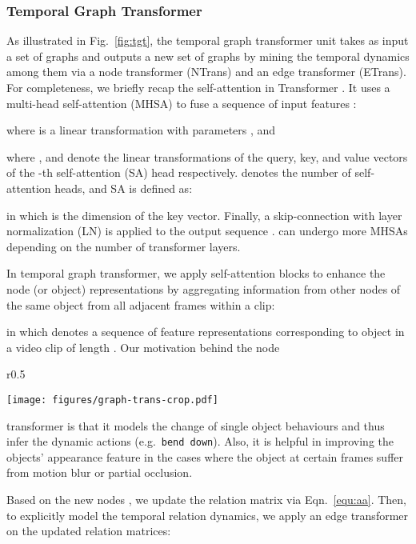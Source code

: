 \documentclass[runningheads]{llncs}
\newcommand{\eg}{e.g.}
\begin{document}
\subsubsection{Temporal Graph Transformer}
As illustrated in Fig.~\ref{fig:tgt}, the temporal graph transformer unit takes as input a set of graphs  and outputs a new 
set of graphs  by mining the temporal dynamics among them via a node transformer (NTrans) and an edge transformer (ETrans). 
For completeness, we briefly recap the self-attention in Transformer \cite{vaswani2017attention}. It uses a multi-head self-attention (MHSA) to fuse a sequence of input features :

where  is a linear transformation with parameters , and

where ,  and  denote the linear transformations of the query, key, and value vectors of the -th self-attention (SA) head respectively.  denotes the number of self-attention heads, and SA is defined as:

in which  is the dimension of the key vector. Finally, a skip-connection with layer normalization (LN) is applied to the output sequence .  can undergo more MHSAs depending on the number of transformer layers.

In  temporal graph transformer, we apply  self-attention blocks to enhance the node (or object) representations by aggregating information from other nodes of the same object from all adjacent frames within a clip:

in which  denotes a sequence of feature representations corresponding to object  in a video clip of length . Our motivation behind the node
\begin{wrapfigure}[12]{r}{0.5\textwidth}
 \vspace{-10pt}
  \begin{center}
    \texttt{[image: figures/graph-trans-crop.pdf]}
  \end{center}
   \vspace{-20pt}
  \caption{Illustration of temporal graph transformer in a short video clip.}
  \label{fig:tgt}
\end{wrapfigure}
transformer is that it models the change of single object behaviours and thus infer the dynamic actions (\eg~\texttt{bend down}). Also, it is helpful in improving the objects' appearance feature in the cases where the object at certain frames suffer from motion blur or partial occlusion.

Based on the new nodes , we  update the relation matrix  via Eqn.~\eqref{equ:aa}. Then, to explicitly model the temporal relation dynamics, we apply an edge transformer on the updated relation matrices: 
\end{document}
